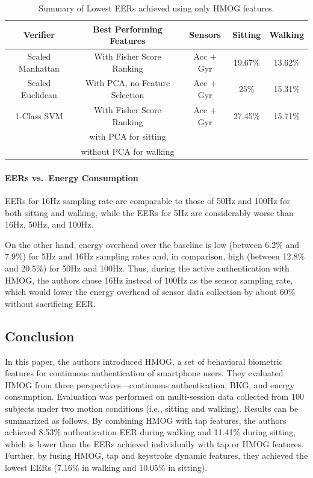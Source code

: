 \documentclass{article}
\begin{document}
\begin{table}[!htbp]
  \caption{Summary of Lowest EERs achieved using only HMOG features.}%
  \centering
  \begin{tabular}{| c | c | c | c | c |} %
  \hline
  Verifier & Best Performing Features & Sensors & Sitting & Walking \\ \hline  %
  Scaled Manhattan & With Fisher Score Ranking & Acc + Gyr & 19.67\% & 13.62\%  \\ \hline %
  Scaled Euclidean & With PCA, no Feature Selection	& Acc + Gyr	& 25\% & 15.31\% \\ \hline %
  1-Class SVM & With Fisher Score Ranking & Acc + Gyr	& 27.45\% & 15.71\% \\ %
    & with PCA for sitting & 	&  & \\ %
    & without PCA for walking & 	&  & \\ \hline %
  \end{tabular}
  \label{tab:individualperformance}
  \vspace{12pt}
\end{table}

\paragraph{EERs vs.~Energy Consumption} 
EERs for 16Hz 
sampling rate are comparable to those of 50Hz and 100Hz for both sitting and walking, while the EERs for 5Hz are 
considerably worse than 16Hz, 50Hz, and 100Hz. 

On the other hand, energy overhead over the baseline is low (between 
6.2\% and 7.9\%) for 5Hz and
16Hz sampling rates and, in comparison, high (between 12.8\% and 20.5\%) for 50Hz 
and 100Hz. 
%
Thus, during the active authentication with HMOG, the authors chose 16Hz instead of 
100Hz as the sensor sampling rate, which would lower the energy overhead of 
sensor data collection by about 60\% without sacrificing EER. 

\subsection{Conclusion}

In this paper, the authors introduced HMOG, a set of behavioral biometric features for continuous 
authentication of smartphone users.  They evaluated HMOG from three perspectives---continuous authentication, BKG, and energy consumption. Evaluation was performed on multi-session data collected from 100 subjects under two motion conditions (i.e., sitting and walking). Results can be summarized as follows. By combining HMOG with tap features, the authors achieved 8.53\% authentication EER during walking and 11.41\% during sitting, which is lower than the EERs achieved individually with tap or HMOG features. Further, by fusing HMOG, tap and keystroke dynamic features, they achieved the lowest EERs (7.16\% in walking and 10.05\% in sitting).
\end{document}
